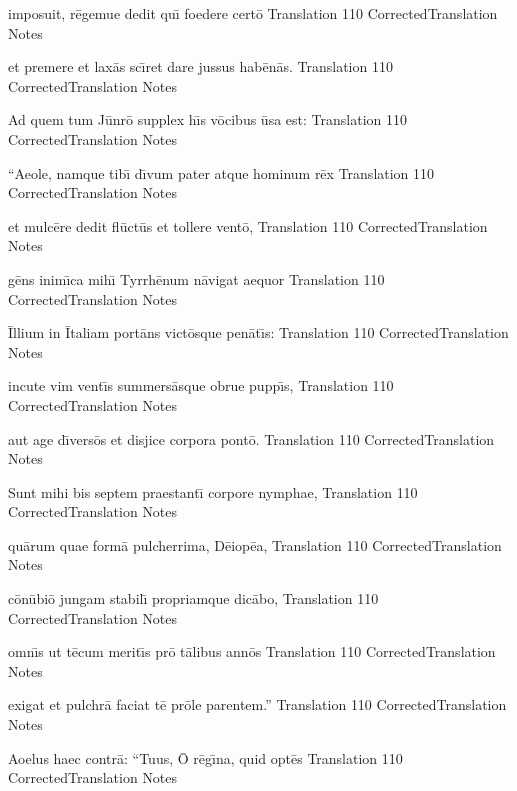 \documentclass[]{article}
\begin{document}
\latline
  {imposuit, r\={e}gemue dedit qu\={\i} foedere cert\={o}}
  { Translation }
  {110}
  { CorrectedTranslation }
  { Notes }


\latline
  {et premere et lax\={a}s sc\={\i}ret dare jussus hab\={e}n\={a}s.}
  { Translation }
  {110}
  { CorrectedTranslation }
  { Notes }


\latline
  {Ad quem tum J\={u}nr\={o} supplex h\={\i}s v\={o}cibus \={u}sa est:}
  { Translation }
  {110}
  { CorrectedTranslation }
  { Notes }


\latline
  {``Aeole, namque tib\={\i} d\={\i}vum pater atque hominum r\={e}x}
  { Translation }
  {110}
  { CorrectedTranslation }
  { Notes }


\latline
  {et mulc\={e}re dedit fl\={u}ct\={u}s et tollere vent\={o},}
  { Translation }
  {110}
  { CorrectedTranslation }
  { Notes }


\latline
  {g\={e}ns inim\={\i}ca mih\={\i} Tyrrh\={e}num n\={a}vigat aequor}
  { Translation }
  {110}
  { CorrectedTranslation }
  { Notes }


\latline
  {\={I}llium in \={I}taliam port\={a}ns vict\={o}sque pen\={a}t\={\i}s:}
  { Translation }
  {110}
  { CorrectedTranslation }
  { Notes }


\latline
  {incute vim vent\={\i}s summers\={a}sque obrue pupp\={\i}s,}
  { Translation }
  {110}
  { CorrectedTranslation }
  { Notes }


\latline
  {aut age d\={\i}vers\={o}s et disjice corpora pont\={o}.}
  { Translation }
  {110}
  { CorrectedTranslation }
  { Notes }


\latline
  {Sunt mihi bis septem praestant\={\i} corpore nymphae,}
  { Translation }
  {110}
  { CorrectedTranslation }
  { Notes }


\latline
  {qu\={a}rum quae form\={a} pulcherrima, D\={e}iop\={e}a,}
  { Translation }
  {110}
  { CorrectedTranslation }
  { Notes }


\latline
  {c\={o}n\={u}bi\={o} jungam stabil\={\i} propriamque dic\={a}bo,}
  { Translation }
  {110}
  { CorrectedTranslation }
  { Notes }


\latline
  {omn\={\i}s ut t\={e}cum merit\={\i}s pr\={o} t\={a}libus ann\={o}s}
  { Translation }
  {110}
  { CorrectedTranslation }
  { Notes }


\latline
  {exigat et pulchr\={a} faciat t\={e} pr\={o}le parentem.''}
  { Translation }
  {110}
  { CorrectedTranslation }
  { Notes }


\latline
  {Aoelus haec contr\={a}:  ``Tuus, \={O} r\={e}g\={\i}na, quid opt\={e}s}
  { Translation }
  {110}
  { CorrectedTranslation }
  { Notes }
\end{document}

